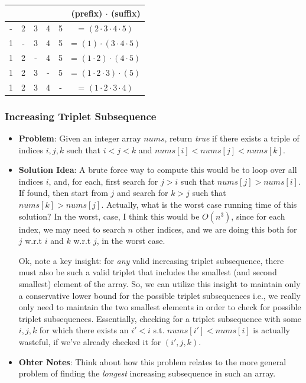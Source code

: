\documentclass[10pt,a4paper]{article}
\begin{document}
\begin{itemize}
    \begin{center}
        \begin{tabular}{c|c|c|c|c|c}
             &  &  &  &  &  (prefix) $\cdot$ (suffix) \\
             \hline
            - & 2 & 3 & 4 & 5 & = $(2 \cdot 3 \cdot 4 \cdot 5)$\\
            \hline
            1 & - & 3 & 4 & 5 & = $(1) \cdot (3 \cdot 4 \cdot 5)$ \\
            \hline
            1 & 2 & - & 4 & 5 & = $(1 \cdot 2) \cdot  (4 \cdot 5)$ \\
            \hline
            1 & 2 & 3 & - & 5 & = $(1 \cdot 2 \cdot 3) \cdot (5)$ \\
            \hline
            1 & 2 & 3 & 4 & - & = $(1 \cdot 2 \cdot 3 \cdot 4)$ \\
        \end{tabular}
    \end{center}
\end{itemize}



\subsubsection*{Increasing Triplet Subsequence}

\begin{itemize}
    \item \textbf{Problem}: Given an integer array $nums$, return \textit{true} if there exists a triple of indices $i,j,k$ such that $i < j < k$ and $nums[i] < nums[j] < nums[k]$.
    \item \textbf{Solution Idea}: A brute force way to compute this would be to loop over all indices $i$, and, for each, first search for $j > i$ such that $nums[j] > nums[i]$. If found, then start from $j$ and search for $k > j$ such that $nums[k] > nums[j]$. Actually, what is the worst case running time of this solution? In the worst, case, I think this would be $O(n^3)$, since for each index, we may need to search $n$ other indices, and we are doing this both for $j$ w.r.t $i$ and $k$ w.r.t $j$, in the worst case.
    
    Ok, note a key insight: for \textit{any} valid increasing triplet subsequence, there must also be such a valid triplet that includes the smallest (and second smallest) element of the array. So, we can utilize this insight to maintain only a conservative lower bound for the possible triplet subsequences i.e., we really only need to maintain the two smallest elements in order to check for possible triplet subsequences. Essentially, checking for a triplet subsequence with some $i,j,k$ for which there exists an $i' < i$ s.t. $nums[i'] < nums[i]$ is actually wasteful, if we've already checked it for $(i',j,k)$.
    \item \textbf{Ohter Notes}: Think about how this problem relates to the more general problem of finding the \textit{longest} increasing subsequence in such an array.
\end{itemize}
\end{document}
